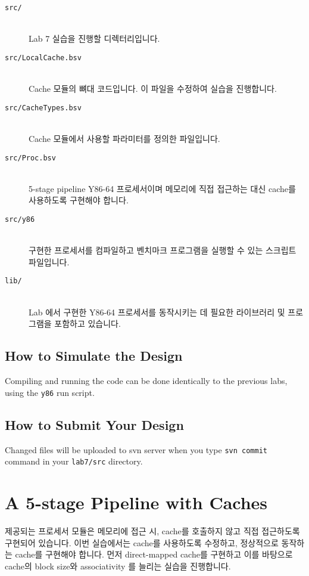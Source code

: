 \documentclass{article}
\begin{document}
\begin{description}
\item [\texttt{src/}]\hfill \ \\
	Lab 7 실습을 진행할 디렉터리입니다.

\item [\texttt{src/LocalCache.bsv}]\hfill \ \\
	Cache 모듈의 뼈대 코드입니다. 이 파일을 수정하여 실습을 진행합니다.

\item [\texttt{src/CacheTypes.bsv}]\hfill \ \\
	Cache 모듈에서 사용할 파라미터를 정의한 파일입니다.

\item [\texttt{src/Proc.bsv}]\hfill \ \\
	5-stage pipeline Y86-64 프로세서이며 메모리에 직접 접근하는 대신 cache를 사용하도록 구현해야 합니다.

\item [\texttt{src/y86}]\hfill \ \\
	구현한 프로세서를 컴파일하고 벤치마크 프로그램을 실행할 수 있는 스크립트 파일입니다.

\item [\texttt{lib/}]\hfill \ \\
	Lab 에서 구현한 Y86-64 프로세서를 동작시키는 데 필요한 라이브러리 및 프로그램을 포함하고 있습니다.
\end{description}

\subsection{How to Simulate the Design}
Compiling and running the code can be done identically to the previous
labs, using the \texttt{y86} run script.


\subsection{How to Submit Your Design}
Changed files will be uploaded to svn server when you type \texttt{svn commit} command
in your \texttt{lab7/src} directory.

\section{A 5-stage Pipeline with Caches}
제공되는 프로세서 모듈은 메모리에 접근 시, cache를 호출하지 않고 직접 접근하도록 구현되어 있습니다.
이번 실습에서는 cache를 사용하도록 수정하고, 정상적으로 동작하는 cache를 구현해야 합니다.
먼저 direct-mapped cache를 구현하고 이를 바탕으로
cache의 block size와 associativity 를 늘리는 실습을 진행합니다.
\end{document}
